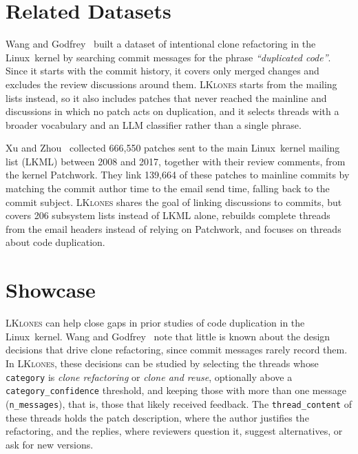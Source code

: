 \documentclass[10pt,conference]{IEEEtran}
\begin{document}
\section{Related Datasets}\label{sec:related}

Wang and Godfrey~\cite{wang2014intentional} built a dataset of intentional clone refactoring in the \mbox{Linux kernel} by searching commit messages for the phrase \textit{``duplicated code''}. Since it starts with the commit history, it covers only merged changes and excludes the review discussions around them. \textsc{LKlones} starts from the mailing lists instead, so it also includes patches that never reached the mainline and discussions in which no patch acts on duplication, and it selects threads with a broader vocabulary and an LLM classifier rather than a single phrase.

Xu and Zhou~\cite{xu2018patchwork} collected 666,550 patches sent to the main \mbox{Linux kernel} mailing list (LKML) between 2008 and 2017, together with their review comments, from the kernel Patchwork. They link 139,664 of these patches to mainline commits by matching the commit author time to the email send time, falling back to the commit subject. \textsc{LKlones} shares the goal of linking discussions to commits, but covers 206 subsystem lists instead of LKML alone, rebuilds complete threads from the email headers instead of relying on Patchwork, and focuses on threads about code duplication.

\section{Showcase}\label{sec:showcase}

\textsc{LKlones} can help close gaps in prior studies of code duplication in the \mbox{Linux kernel}. Wang and Godfrey~\cite{wang2014intentional} note that little is known about the design decisions that drive clone refactoring, since commit messages rarely record them. In \textsc{LKlones}, these decisions can be studied by selecting the threads whose \texttt{category} is \textit{clone refactoring} or \textit{clone and reuse}, optionally above a \texttt{category\_confidence} threshold, and keeping those with more than one message (\texttt{n\_messages}), that is, those that likely received feedback. The \texttt{thread\_content} of these threads holds the patch description, where the author justifies the refactoring, and the replies, where reviewers question it, suggest alternatives, or ask for new versions.
\end{document}
